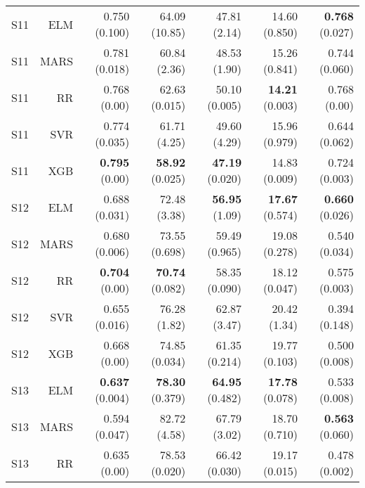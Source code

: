 \begin{table}
\begin{tabular}{rrrrrrr}
    S11 &       ELM &                       0.750 (0.100) &             64.09 (10.85) &            47.81 (2.14) &           14.60 (0.850) &  { \bf 0.768} (0.027) \\
    S11 &      MARS &                       0.781 (0.018) &              60.84 (2.36) &            48.53 (1.90) &           15.26 (0.841) &         0.744 (0.060) \\
    S11 &        RR &                        0.768 (0.00) &             62.63 (0.015) &           50.10 (0.005) &    { \bf 14.21} (0.003) &          0.768 (0.00) \\
    S11 &       SVR &                       0.774 (0.035) &              61.71 (4.25) &            49.60 (4.29) &           15.96 (0.979) &         0.644 (0.062) \\
    S11 &       XGB &                 { \bf 0.795} (0.00) &      { \bf 58.92} (0.025) &    { \bf 47.19} (0.020) &           14.83 (0.009) &         0.724 (0.003) \\
    S12 &       ELM &                       0.688 (0.031) &              72.48 (3.38) &     { \bf 56.95} (1.09) &    { \bf 17.67} (0.574) &  { \bf 0.660} (0.026) \\
    S12 &      MARS &                       0.680 (0.006) &             73.55 (0.698) &           59.49 (0.965) &           19.08 (0.278) &         0.540 (0.034) \\
    S12 &        RR &                 { \bf 0.704} (0.00) &      { \bf 70.74} (0.082) &           58.35 (0.090) &           18.12 (0.047) &         0.575 (0.003) \\
    S12 &       SVR &                       0.655 (0.016) &              76.28 (1.82) &            62.87 (3.47) &            20.42 (1.34) &         0.394 (0.148) \\
    S12 &       XGB &                        0.668 (0.00) &             74.85 (0.034) &           61.35 (0.214) &           19.77 (0.103) &         0.500 (0.008) \\
    S13 &       ELM &                { \bf 0.637} (0.004) &      { \bf 78.30} (0.379) &    { \bf 64.95} (0.482) &    { \bf 17.78} (0.078) &         0.533 (0.008) \\
    S13 &      MARS &                       0.594 (0.047) &              82.72 (4.58) &            67.79 (3.02) &           18.70 (0.710) &  { \bf 0.563} (0.060) \\
    S13 &        RR &                        0.635 (0.00) &             78.53 (0.020) &           66.42 (0.030) &           19.17 (0.015) &         0.478 (0.002) \\

\end{tabular}
\end{table}
